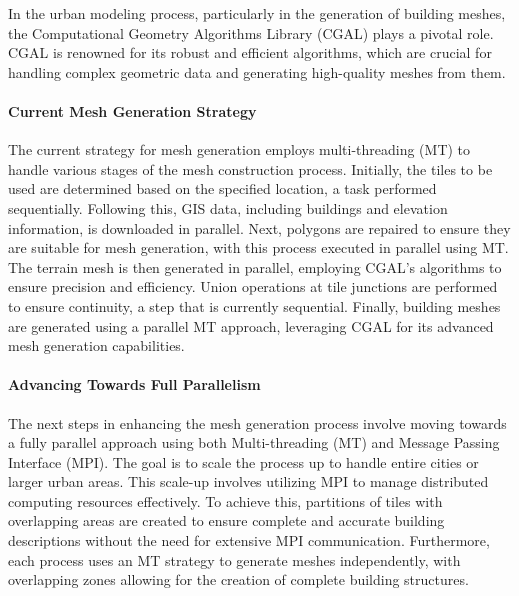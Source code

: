 \documentclass[runningheads]{llncs}
\begin{document}
In the urban modeling process, particularly in the generation of building meshes, the Computational Geometry Algorithms Library (CGAL) plays a pivotal role. CGAL is renowned for its robust and efficient algorithms, which are crucial for handling complex geometric data and generating high-quality meshes from them.

\paragraph{Current Mesh Generation Strategy}
The current strategy for mesh generation employs multi-threading (MT) to handle various stages of the mesh construction process. Initially, the tiles to be used are determined based on the specified location, a task performed sequentially. Following this, GIS data, including buildings and elevation information, is downloaded in parallel. Next, polygons are repaired to ensure they are suitable for mesh generation, with this process executed in parallel using MT. The terrain mesh is then generated in parallel, employing CGAL's algorithms to ensure precision and efficiency. Union operations at tile junctions are performed to ensure continuity, a step that is currently sequential. Finally, building meshes are generated using a parallel MT approach, leveraging CGAL for its advanced mesh generation capabilities.

\paragraph{Advancing Towards Full Parallelism}
The next steps in enhancing the mesh generation process involve moving towards a fully parallel approach using both Multi-threading (MT) and Message Passing Interface (MPI). The goal is to scale the process up to handle entire cities or larger urban areas. This scale-up involves utilizing MPI to manage distributed computing resources effectively. To achieve this, partitions of tiles with overlapping areas are created to ensure complete and accurate building descriptions without the need for extensive MPI communication. Furthermore, each process uses an MT strategy to generate meshes independently, with overlapping zones allowing for the creation of complete building structures.
\end{document}
